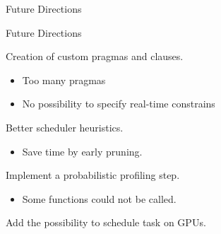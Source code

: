 \documentclass[xcolor=dvipsnames]{beamer}
\begin{document}
\begin{section}{Future Directions}



\begin{frame}{\hskip 0.3cm Future Directions}



 Creation of custom pragmas and clauses.

\begin{itemize}

\item Too many pragmas 

\item No possibility to specify real-time constrains

\end{itemize}

  Better scheduler heuristics.

\begin{itemize}

\item Save time by early pruning.

\end{itemize}

 Implement a probabilistic profiling step.

\begin{itemize}

\item Some functions could not be called.

\end{itemize}

 Add the possibility to schedule task on GPUs.




\end{frame}












\end{section}
\end{document}
